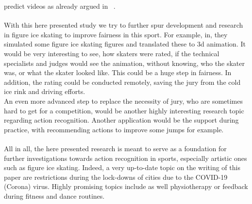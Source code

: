 predict videos as already argued in ~\cite{staf}.
\\\mbox{}\\
With this here presented study we try to further spur development and research in figure ice skating to improve
fairness in this sport.
For example, in\cite{figureskatingsimulation}, they simulated some figure ice skating figures and translated these to 3d
animation. It would be very interesting to see, how skaters were rated, if the technical specialists and judges would see
the animation, without knowing, who the skater was, or what the skater looked like.
This could be a huge step in fairness.
In addition, the rating could be conducted remotely, saving the jury from the cold
ice rink and driving efforts.\\
An even more advanced step to replace the necessity of jury, who are sometimes hard to get for a competition, would be another
highly interesting research topic regarding action recognition.
Another application would be the support during practice, with recommending actions to improve some jumps for example.
\\\mbox{}\\
All in all, the here presented research is meant to serve as a foundation for further investigations towards action recognition
in sports, especially artistic ones such as figure ice skating.
Indeed, a very up-to-date topic on the writing of this paper are restrictions during the lock-downs of cities due to the
COVID-19 (Corona) virus.
Highly promising topics include as well physiotherapy or feedback during fitness and dance routines.
